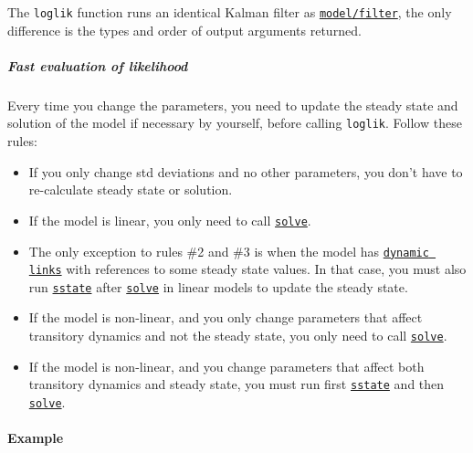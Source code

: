 The \texttt{loglik} function runs an identical Kalman filter as
\href{model/filter}{\texttt{model/filter}}, the only difference is the
types and order of output arguments returned.

\subparagraph{Fast evaluation of
likelihood}\label{fast-evaluation-of-likelihood}

Every time you change the parameters, you need to update the steady
state and solution of the model if necessary by yourself, before calling
\texttt{loglik}. Follow these rules:

\begin{itemize}
\item
  If you only change std deviations and no other parameters, you don't
  have to re-calculate steady state or solution.
\item
  If the model is linear, you only need to call
  \href{model/solve}{\texttt{solve}}.
\item
  The only exception to rules \#2 and \#3 is when the model has
  \href{modellang/links}{\texttt{dynamic links}} with references to some
  steady state values. In that case, you must also run
  \href{model/sstate}{\texttt{sstate}} after
  \href{model/solve}{\texttt{solve}} in linear models to update the
  steady state.
\item
  If the model is non-linear, and you only change parameters that affect
  transitory dynamics and not the steady state, you only need to call
  \href{model/solve}{\texttt{solve}}.
\item
  If the model is non-linear, and you change parameters that affect both
  transitory dynamics and steady state, you must run first
  \href{model/sstate}{\texttt{sstate}} and then
  \href{model/solve}{\texttt{solve}}.
\end{itemize}

\paragraph{Example}\label{example}


